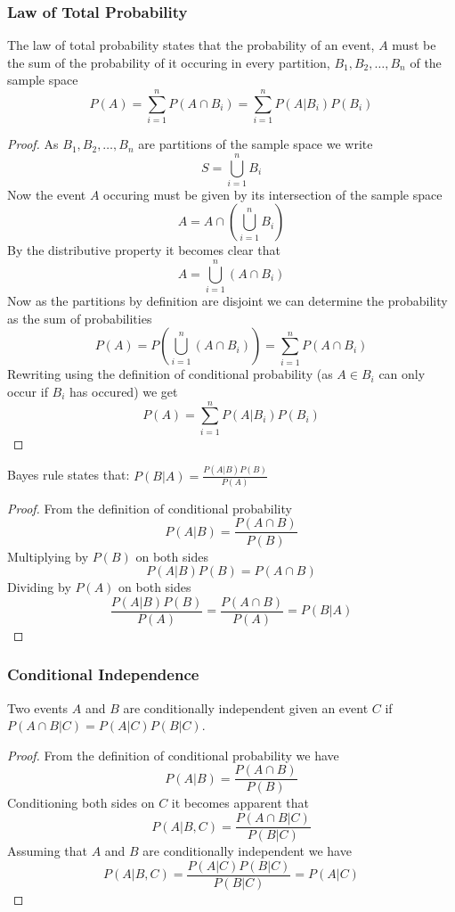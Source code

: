 \subsubsection{Law of Total Probability}
The law of total probability states that the probability of an event, $A$ must be the sum of the probability of it occuring in every partition, $B_{1},B_{2},\ldots,B_{n}$ of the sample space
\[
    P(A)=\sum_{i=1}^{n}P(A\cap B_{i})=\sum_{i=1}^{n}P(A|B_{i})P(B_{i})
\]
\begin{proof}
  As $B_{1},B_{2},\ldots,B_{n}$ are partitions of the sample space we write
  \[
      S=\bigcup_{i=1}^{n} B_{i}
  \]
  Now the event $A$ occuring must be given by its intersection of the sample space
  \[
      A=A\cap\left(\bigcup_{i=1}^{n} B_{i}\right)
  \]
  By the distributive property it becomes clear that
  \[
      A=\bigcup_{i=1}^{n} (A\cap B_{i})
  \]
  Now as the partitions by definition are disjoint we can determine the probability as the sum of probabilities
  \[
      P(A)=P\left(\bigcup_{i=1}^{n} (A\cap B_{i})\right)=\sum_{i=1}^{n}P(A\cap B_{i})
  \]
  Rewriting using the definition of conditional probability (as $A\in B_{i}$ can only occur if $B_{i}$ has occured) we get
  \[
      P(A)=\sum_{i=1}^{n}P(A|B_{i})P(B_{i})
  \]
\end{proof}
\begin{theorem}
  Bayes rule states that: $P(B|A)=\frac{P(A|B)P(B)}{P(A)}$
\end{theorem}
\begin{proof}
  From the definition of conditional probability
  \[
      P(A|B)=\frac{P(A\cap B)}{P(B)}
  \]
  Multiplying by $P(B)$ on both sides
  \[
      P(A|B)P(B)=P(A\cap B)
  \]
  Dividing by $P(A)$ on both sides
  \[
      \frac{P(A|B)P(B)}{P(A)}=\frac{P(A\cap B)}{P(A)}=P(B|A)
  \]
\end{proof}
\subsubsection{Conditional Independence}
\begin{definition}
  Two events $A$ and $B$ are conditionally independent given an event $C$ if $P(A\cap B|C)=P(A|C)P(B|C)$.
\end{definition}
\begin{proof}
  From the definition of conditional probability we have
  \[
      P(A|B)=\frac{P(A\cap B)}{P(B)}
  \]
  Conditioning both sides on $C$ it becomes apparent that
  \[
      P(A|B,C)=\frac{P(A\cap B|C)}{P(B|C)}
  \]
  Assuming that $A$ and $B$ are conditionally independent we have
  \[
      P(A|B,C)=\frac{P(A|C)P(B|C)}{P(B|C)}=P(A|C)
  \]
\end{proof}
